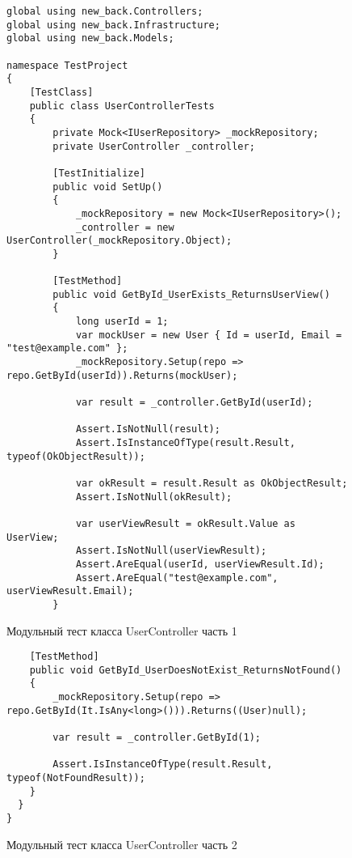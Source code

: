 \begin{figure}[ht]
\lstset{style=sharpc}
\begin{lstlisting}
global using new_back.Controllers;
global using new_back.Infrastructure;
global using new_back.Models;

namespace TestProject
{
    [TestClass]
    public class UserControllerTests
    {
        private Mock<IUserRepository> _mockRepository;
        private UserController _controller;

        [TestInitialize]
        public void SetUp()
        {
            _mockRepository = new Mock<IUserRepository>();
            _controller = new UserController(_mockRepository.Object);
        }

        [TestMethod]
        public void GetById_UserExists_ReturnsUserView()
        {
            long userId = 1;
            var mockUser = new User { Id = userId, Email = "test@example.com" };
            _mockRepository.Setup(repo => repo.GetById(userId)).Returns(mockUser);

            var result = _controller.GetById(userId);

            Assert.IsNotNull(result);
            Assert.IsInstanceOfType(result.Result, typeof(OkObjectResult));

            var okResult = result.Result as OkObjectResult;
            Assert.IsNotNull(okResult);

            var userViewResult = okResult.Value as UserView;
            Assert.IsNotNull(userViewResult);
            Assert.AreEqual(userId, userViewResult.Id);
            Assert.AreEqual("test@example.com", userViewResult.Email);
        }
\end{lstlisting}
\caption{Модульный тест класса UserController часть 1}
\label{unitcontr1:image}
\end{figure}


\begin{figure}[ht]
\lstset{style=sharpc}
\begin{lstlisting}
    [TestMethod]
    public void GetById_UserDoesNotExist_ReturnsNotFound()
    {
        _mockRepository.Setup(repo => repo.GetById(It.IsAny<long>())).Returns((User)null);

        var result = _controller.GetById(1);

        Assert.IsInstanceOfType(result.Result, typeof(NotFoundResult));
    }
  }
}
\end{lstlisting}
\caption{Модульный тест класса UserController часть 2}
\label{unitcontr2:image}
\end{figure}

